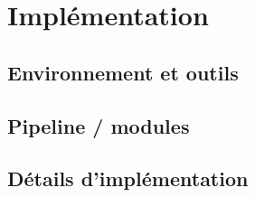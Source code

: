 \chapter{Implémentation}

\section{Environnement et outils}

\section{Pipeline / modules}

\section{Détails d'implémentation}

